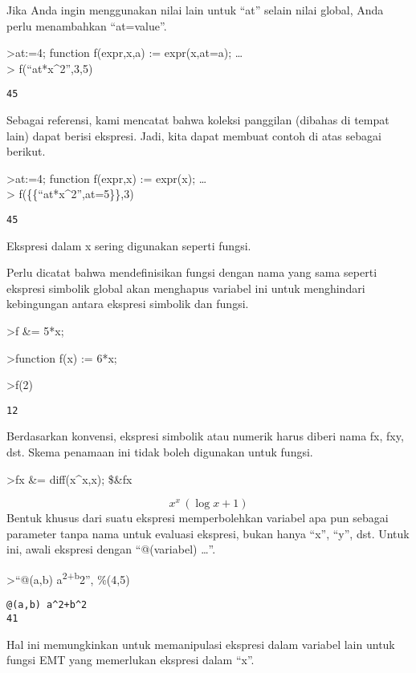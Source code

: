 \documentclass[
]{book}
\begin{document}
Jika Anda ingin menggunakan nilai lain untuk ``at'' selain nilai global, Anda perlu menambahkan ``at=value''.

\textgreater at:=4; function f(expr,x,a) := expr(x,at=a); \ldots{}\\
\textgreater{} f(``at*x\^{}2'',3,5)

\begin{verbatim}
45
\end{verbatim}

Sebagai referensi, kami mencatat bahwa koleksi panggilan (dibahas di tempat lain) dapat berisi ekspresi. Jadi, kita dapat membuat contoh di atas sebagai berikut.

\textgreater at:=4; function f(expr,x) := expr(x); \ldots{}\\
\textgreater{} f(\{\{``at*x\^{}2'',at=5\}\},3)

\begin{verbatim}
45
\end{verbatim}

Ekspresi dalam x sering digunakan seperti fungsi.

Perlu dicatat bahwa mendefinisikan fungsi dengan nama yang sama seperti ekspresi simbolik global akan menghapus variabel ini untuk menghindari kebingungan antara ekspresi simbolik dan fungsi.

\textgreater f \&= 5*x;

\textgreater function f(x) := 6*x;

\textgreater f(2)

\begin{verbatim}
12
\end{verbatim}

Berdasarkan konvensi, ekspresi simbolik atau numerik harus diberi nama fx, fxy, dst. Skema penamaan ini tidak boleh digunakan untuk fungsi.

\textgreater fx \&= diff(x\^{}x,x); \$\&fx

\[x^{x}\,\left(\log x+1\right)\]Bentuk khusus dari suatu ekspresi memperbolehkan variabel apa pun sebagai parameter tanpa nama untuk evaluasi ekspresi, bukan hanya ``x'', ``y'', dst. Untuk ini, awali ekspresi dengan ``@(variabel) \ldots{}''.

\textgreater{}``@(a,b) a\textsuperscript{2+b}2'', \%(4,5)

\begin{verbatim}
@(a,b) a^2+b^2
41
\end{verbatim}

Hal ini memungkinkan untuk memanipulasi ekspresi dalam variabel lain untuk fungsi EMT yang memerlukan ekspresi dalam ``x''.
\end{document}

